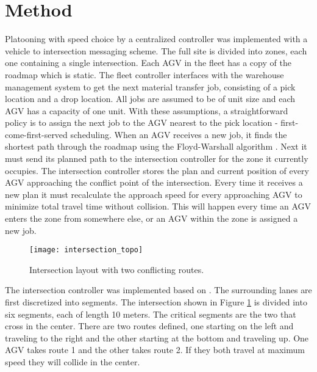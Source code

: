 \section{Method}
Platooning with speed choice by a centralized controller was implemented with a vehicle to intersection messaging scheme. The full site is divided into zones, each one containing a single intersection. Each AGV in the fleet has a copy of the roadmap which is  static. The fleet controller interfaces with the warehouse management system to get the next material transfer job, consisting of a pick location and a drop location. All jobs are assumed to be of unit size and each AGV has a capacity of one unit. With these assumptions, a straightforward policy is to assign the next job to the AGV nearest to the pick location - first-come-first-served scheduling. When an AGV receives a new job, it finds the shortest path through the roadmap using the Floyd-Warshall algorithm \cite{Djojo2013}. Next it must send its planned path to the intersection controller for the zone it currently occupies. The intersection controller stores the plan and current position of every AGV approaching the conflict point of the intersection. Every time it receives a new plan it must recalculate the approach speed for every approaching AGV to minimize total travel time without collision. This will happen every time an AGV enters the zone from somewhere else, or an AGV within the zone is assigned a new job.

\begin{figure}[ht]
\centering
\texttt{[image: intersection\_topo]}
\caption{Intersection layout with two conflicting routes.}
\label{fig:layout}
\end{figure}

The intersection controller was implemented based on \cite{Digani2019}. The surrounding lanes are first discretized into segments. The intersection shown in Figure \ref{fig:layout} is divided into six segments, each of length 10 meters. The critical segments are the two that cross in the center. There are two routes defined, one starting on the left and traveling to the right and the other starting at the bottom and traveling up. One AGV takes route 1 and the other takes route 2. If they both travel at maximum speed they will collide in the center.

